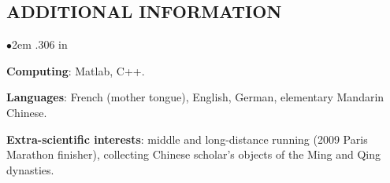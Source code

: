 \documentclass[a4paper, 12pt]{scrartcl}
\newcommand{\pubSpace}{\vspace{-0.27in}}
\begin{document}
\subsection*{\sc\bf ADDITIONAL INFORMATION}
\begin{list}{$\bullet$}{ 2em \leftmargin .306 in \itemsep 0.025in}
\vspace {-0.05in}
\item {\bf Computing}: Matlab, C++.\\
\pubSpace 
\item {\bf Languages}: French (mother tongue), English, German, elementary Mandarin {\hbox{Chinese}}.\\
\pubSpace  
\item {\bf Extra-scientific interests}: middle and long-distance running (2009 Paris Marathon {\hbox{finisher}}), collecting Chinese scholar's objects of the Ming and Qing dynasties.\\
\end{list}
\end{document}
